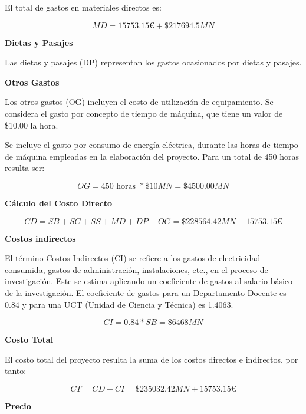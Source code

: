 El total de gastos en materiales directos es:

\begin{equation}
    MD = 15753.15€ + \$217694.5 MN
\end{equation}

\textbf{Dietas y Pasajes}

Las dietas y pasajes (DP) representan los gastos ocasionados por dietas y pasajes.

\textbf{Otros Gastos}

Los otros gastos (OG) incluyen el costo de utilización de equipamiento. Se considera el gasto por
concepto de tiempo de máquina, que tiene un valor de \$10.00 la hora.

Se incluye el gasto por consumo de energía eléctrica, durante las horas de tiempo de máquina empleadas
en la elaboración del proyecto. Para un total de 450 horas resulta ser:

\begin{equation}
    OG = 450 \text{ horas } * \$10MN = \$4500.00MN
\end{equation}





\textbf{Cálculo del Costo Directo}

\begin{equation}
    CD = SB + SC + SS + MD + DP + OG = \$228564.42 MN + 15753.15€
\end{equation}

\textbf{Costos indirectos}

El término Costos Indirectos (CI) se refiere a los gastos de electricidad consumida, gastos de administración,
instalaciones, etc., en el proceso de investigación. Este se estima aplicando un coeficiente de gastos al
salario básico de la investigación. El coeficiente de gastos para un Departamento Docente es 0.84 y para una
UCT (Unidad de Ciencia y Técnica) es 1.4063.

\begin{equation}
    CI = 0.84 * SB = \$6468 MN
\end{equation}

\textbf{Costo Total}

El costo total del proyecto resulta la suma de los costos directos e indirectos, por tanto:

\begin{equation}
    CT = CD + CI = \$235032.42MN + 15753.15€
\end{equation}

\textbf{Precio}

